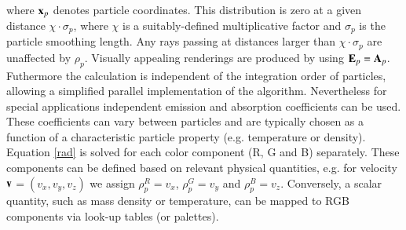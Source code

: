 \documentclass[1p]{elsarticle}
\begin{document}
\begin{itemize}
where ${\bf x}_p$ denotes particle coordinates. This distribution is zero at a given distance $\chi\cdot\sigma_p$, 
where $\chi$ is a suitably-defined multiplicative factor and $\sigma_p$ is the particle smoothing length. Any rays passing at distances larger than $\chi\cdot\sigma_p$ are unaffected by $\rho_p$. Visually appealing renderings are produced by using ${\bf E}_p = {\bf A}_p$. Futhermore the calculation is independent of the integration order of particles, allowing a simplified parallel implementation of the algorithm. Nevertheless for special applications independent emission and absorption coefficients can be used. These coefficients
can vary between particles and are typically chosen as a function of a characteristic
particle property (e.g. temperature or density).
Equation \eqref{rad} is solved for each color component (R, G and B) separately. These components can be defined based on relevant physical quantities, e.g. for velocity $\bf v$$=(v_x, v_y, v_z)$ we assign $\rho_p^{R}=v_x$, $\rho_p^{G}=v_y$ and $\rho_p^{B}=v_z$. Conversely, a scalar quantity, such as mass density or temperature, can be mapped to RGB components via look-up tables (or palettes). 
\end{itemize}
\end{document}
